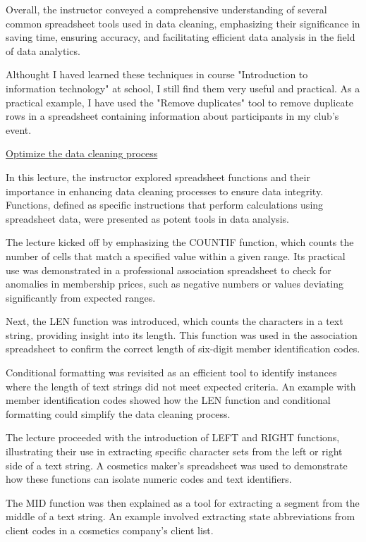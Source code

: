 \documentclass[]{article}
\begin{document}
Overall, the instructor conveyed a comprehensive understanding of several common spreadsheet tools used in data cleaning, emphasizing their significance in saving time, ensuring accuracy, and facilitating efficient data analysis in the field of data analytics.

Althought I haved learned these techniques in course "Introduction to information technology" at school, I still find them very useful and practical. As a practical example, I have used the "Remove duplicates" tool to remove duplicate rows in a spreadsheet containing information about participants in my club's event.

\uline{Optimize the data cleaning process}

In this lecture, the instructor explored spreadsheet functions and their importance in enhancing data cleaning processes to ensure data integrity. Functions, defined as specific instructions that perform calculations using spreadsheet data, were presented as potent tools in data analysis.

The lecture kicked off by emphasizing the COUNTIF function, which counts the number of cells that match a specified value within a given range. Its practical use was demonstrated in a professional association spreadsheet to check for anomalies in membership prices, such as negative numbers or values deviating significantly from expected ranges.

Next, the LEN function was introduced, which counts the characters in a text string, providing insight into its length. This function was used in the association spreadsheet to confirm the correct length of six-digit member identification codes.

Conditional formatting was revisited as an efficient tool to identify instances where the length of text strings did not meet expected criteria. An example with member identification codes showed how the LEN function and conditional formatting could simplify the data cleaning process.

The lecture proceeded with the introduction of LEFT and RIGHT functions, illustrating their use in extracting specific character sets from the left or right side of a text string. A cosmetics maker's spreadsheet was used to demonstrate how these functions can isolate numeric codes and text identifiers.

The MID function was then explained as a tool for extracting a segment from the middle of a text string. An example involved extracting state abbreviations from client codes in a cosmetics company's client list.
\end{document}
